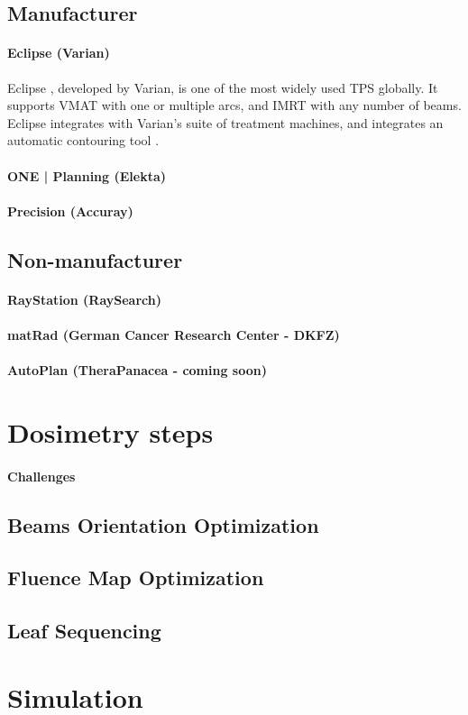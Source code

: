 \subsection{Manufacturer}
\paragraph{Eclipse (Varian)}
Eclipse \cite{eclipse}, developed by Varian, is one of the most widely used TPS globally.
It supports VMAT with one or multiple arcs, and IMRT with any number of beams.
Eclipse integrates with Varian's suite of treatment machines, and integrates an automatic contouring tool \cite{eclipse_brochure}.

\paragraph{ONE | Planning (Elekta)}
\paragraph{Precision (Accuray)}
\subsection{Non-manufacturer}
\paragraph{RayStation (RaySearch)}
\paragraph{matRad (German Cancer Research Center - DKFZ)}
\paragraph{AutoPlan (TheraPanacea - coming soon)}

\section{Dosimetry steps}
\paragraph{Challenges}
\subsection[BOO]{Beams Orientation Optimization}
\subsection[FMO]{Fluence Map Optimization}
\subsection[LS]{Leaf Sequencing}

\section{Simulation}

